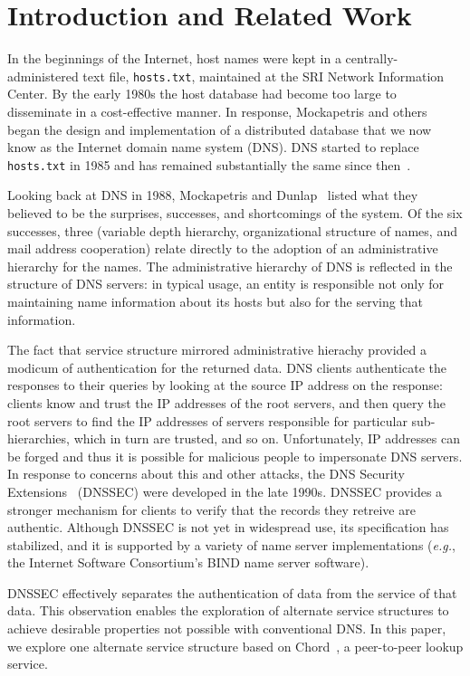 \section{Introduction and Related Work}

In the beginnings of the Internet, host names were kept
in a centrally-administered text file, {\tt hosts.txt},
maintained at the SRI Network Information Center.
By the early 1980s the host database had become too large
to disseminate in a cost-effective manner.
In response, Mockapetris and others began the design and
implementation of a distributed database that we now know
as the Internet domain name system (DNS).
DNS started to replace {\tt hosts.txt} in 1985 and has remained
substantially the same since then~\cite{dns-concept:rfc, dns}.

Looking back at DNS in 1988, Mockapetris and Dunlap~\cite{dns}
listed what they believed to be the surprises, successes,
and shortcomings of the system.  Of the six successes,
three (variable depth hierarchy, organizational structure
of names, and mail address cooperation) relate directly 
to the adoption of an administrative hierarchy for the names.
The administrative hierarchy of DNS is reflected in the 
structure of DNS servers: in typical usage, an
entity is responsible not only for maintaining name information
about its hosts
but also for the serving that information.

The fact that service structure mirrored administrative hierachy
provided a modicum of authentication for the returned data.
DNS clients authenticate the responses to their queries by
looking at the source IP address on the response:
clients know and trust the IP addresses of the root servers, and then
query the root servers to find the IP addresses of servers
responsible for particular sub-hierarchies, which in turn are
trusted, and so on.
Unfortunately, IP addresses can be forged and thus it is possible
for malicious people to impersonate DNS servers.
In response to concerns about this and
other attacks, the DNS Security Extensions~\cite{dnssec:rfc}
(DNSSEC) were developed in the late 1990s.
DNSSEC provides a stronger mechanism for clients to verify that the
records they retreive are authentic.
Although DNSSEC is not yet in widespread use, its specification
has stabilized, and it is supported by a variety of name server
implementations ({\em e.g.}, the Internet Software Consortium's
BIND name server software).

DNSSEC effectively separates the authentication of data from the
service of that data.  This observation enables the exploration of alternate service 
structures to achieve desirable properties not possible
with conventional DNS.  In this paper, we explore one
alternate service structure based on Chord~\cite{chord:sigcomm},
a peer-to-peer lookup service.


